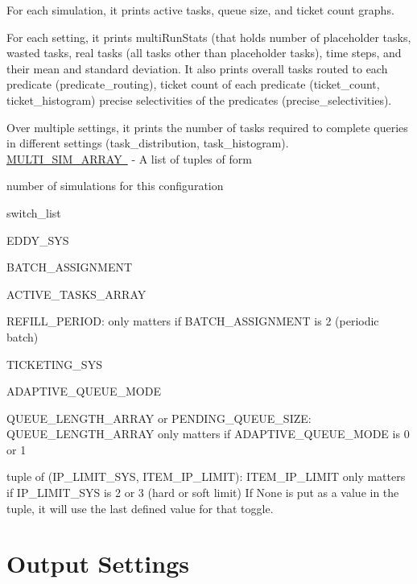 \begin{DoxyItemize}
\item For each simulation, it prints active tasks, queue size, and ticket count graphs.
\item For each setting, it prints multi\+Run\+Stats (that holds number of placeholder tasks, wasted tasks, real tasks (all tasks other than placeholder tasks), time steps, and their mean and standard deviation. It also prints overall tasks routed to each predicate (predicate\+\_\+routing), ticket count of each predicate (ticket\+\_\+count, ticket\+\_\+histogram) precise selectivities of the predicates (precise\+\_\+selectivities).
\item Over multiple settings, it prints the number of tasks required to complete queries in different settings (task\+\_\+distribution, task\+\_\+histogram). ~\newline
 \mbox{\hyperlink{}{M\+U\+L\+T\+I\+\_\+\+S\+I\+M\+\_\+\+A\+R\+R\+AY }} -\/ A list of tuples of form
\item number of simulations for this configuration
\item switch\+\_\+list
\item E\+D\+D\+Y\+\_\+\+S\+YS
\item B\+A\+T\+C\+H\+\_\+\+A\+S\+S\+I\+G\+N\+M\+E\+NT
\item A\+C\+T\+I\+V\+E\+\_\+\+T\+A\+S\+K\+S\+\_\+\+A\+R\+R\+AY
\item R\+E\+F\+I\+L\+L\+\_\+\+P\+E\+R\+I\+OD\+: only matters if B\+A\+T\+C\+H\+\_\+\+A\+S\+S\+I\+G\+N\+M\+E\+NT is 2 (periodic batch)
\item T\+I\+C\+K\+E\+T\+I\+N\+G\+\_\+\+S\+YS
\item A\+D\+A\+P\+T\+I\+V\+E\+\_\+\+Q\+U\+E\+U\+E\+\_\+\+M\+O\+DE
\item Q\+U\+E\+U\+E\+\_\+\+L\+E\+N\+G\+T\+H\+\_\+\+A\+R\+R\+AY or P\+E\+N\+D\+I\+N\+G\+\_\+\+Q\+U\+E\+U\+E\+\_\+\+S\+I\+ZE\+: Q\+U\+E\+U\+E\+\_\+\+L\+E\+N\+G\+T\+H\+\_\+\+A\+R\+R\+AY only matters if A\+D\+A\+P\+T\+I\+V\+E\+\_\+\+Q\+U\+E\+U\+E\+\_\+\+M\+O\+DE is 0 or 1
\item tuple of (I\+P\+\_\+\+L\+I\+M\+I\+T\+\_\+\+S\+YS, I\+T\+E\+M\+\_\+\+I\+P\+\_\+\+L\+I\+M\+IT)\+: I\+T\+E\+M\+\_\+\+I\+P\+\_\+\+L\+I\+M\+IT only matters if I\+P\+\_\+\+L\+I\+M\+I\+T\+\_\+\+S\+YS is 2 or 3 (hard or soft limit) If None is put as a value in the tuple, it will use the last defined value for that toggle.
\end{DoxyItemize}\hypertarget{toggles_output}{}\section{Output Settings}\label{toggles_output}
